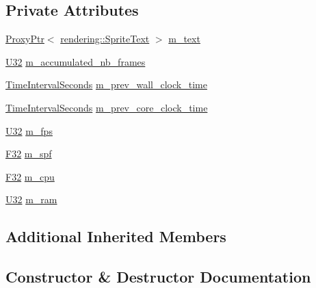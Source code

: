 \subsection*{Private Attributes}
\begin{DoxyCompactItemize}
\item 
\mbox{\hyperlink{classmage_1_1_proxy_ptr}{Proxy\+Ptr}}$<$ \mbox{\hyperlink{classmage_1_1rendering_1_1_sprite_text}{rendering\+::\+Sprite\+Text}} $>$ \mbox{\hyperlink{classmage_1_1script_1_1_stats_script_a1fe11e7a3622fa5e3585fb6786e2d2e7}{m\+\_\+text}}
\item 
\mbox{\hyperlink{namespacemage_a41c104c036fba3756a74e19f793eeaa1}{U32}} \mbox{\hyperlink{classmage_1_1script_1_1_stats_script_a7ef910aceb585af53110697ea5b3f810}{m\+\_\+accumulated\+\_\+nb\+\_\+frames}}
\item 
\mbox{\hyperlink{namespacemage_a21c3d1575018d1e0720948713c76be1f}{Time\+Interval\+Seconds}} \mbox{\hyperlink{classmage_1_1script_1_1_stats_script_acb97500f32da69e9069482df1ebdb7b8}{m\+\_\+prev\+\_\+wall\+\_\+clock\+\_\+time}}
\item 
\mbox{\hyperlink{namespacemage_a21c3d1575018d1e0720948713c76be1f}{Time\+Interval\+Seconds}} \mbox{\hyperlink{classmage_1_1script_1_1_stats_script_a8bf822cd1950abc621f8bd751c00ef78}{m\+\_\+prev\+\_\+core\+\_\+clock\+\_\+time}}
\item 
\mbox{\hyperlink{namespacemage_a41c104c036fba3756a74e19f793eeaa1}{U32}} \mbox{\hyperlink{classmage_1_1script_1_1_stats_script_adc14b9c342874824422d229c1f8573cc}{m\+\_\+fps}}
\item 
\mbox{\hyperlink{namespacemage_aa97e833b45f06d60a0a9c4fc22ae02c0}{F32}} \mbox{\hyperlink{classmage_1_1script_1_1_stats_script_a999da0fb2033212522a1c45a992dcd37}{m\+\_\+spf}}
\item 
\mbox{\hyperlink{namespacemage_aa97e833b45f06d60a0a9c4fc22ae02c0}{F32}} \mbox{\hyperlink{classmage_1_1script_1_1_stats_script_ad7af4d0fec97fd30637d6c1d393c8623}{m\+\_\+cpu}}
\item 
\mbox{\hyperlink{namespacemage_a41c104c036fba3756a74e19f793eeaa1}{U32}} \mbox{\hyperlink{classmage_1_1script_1_1_stats_script_a2a064095ffab6d72370808f383a16580}{m\+\_\+ram}}
\end{DoxyCompactItemize}
\subsection*{Additional Inherited Members}


\subsection{Constructor \& Destructor Documentation}
\mbox{\label{classmage_1_1script_1_1_stats_script_a6863940cb48633fbd5fc56547dc72a76}} 
